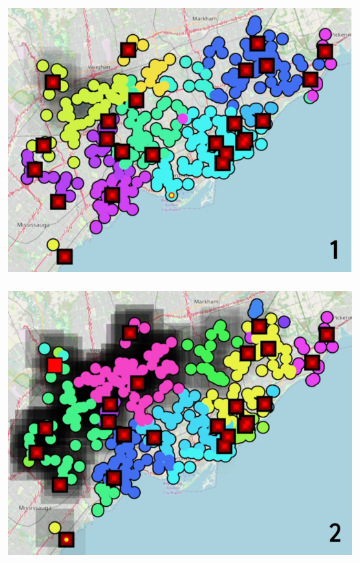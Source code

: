 \begin{figure}[t]
  \begin{subfigure}[b]{0.39\linewidth}
    \centering
    \includegraphics[width=\linewidth]{papers/ieee2022/img/snapshots/step-1.png-low.png}
  \end{subfigure}
  \hfill
  \begin{subfigure}[b]{0.39\linewidth}
    \centering
    \includegraphics[width=\linewidth]{papers/ieee2022/img/snapshots/step-3.png-low.png}
  \end{subfigure}
  \\[0.15cm]
  \begin{subfigure}[b]{0.39\linewidth}
    \centering

\end{subfigure}
\end{figure}
